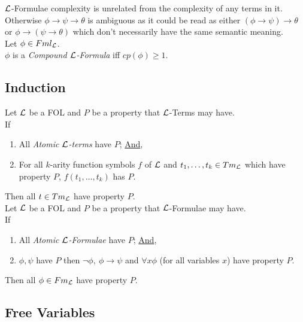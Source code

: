 \documentclass[11pt,a4paper]{article}
\begin{document}
$\mathcal{L}$-Formulae complexity is unrelated from the complexity of any terms in it.\\

Otherwise $\phi\to\psi\to\theta$ is ambiguous as it could be read as either $(\phi\to\psi)\to\theta$ or $\phi\to(\psi\to\theta)$ which don't necessarily have the same semantic meaning.\\

Let $\phi\in Fml_{\mathcal{L}}$.\\
$\phi$ is a \textit{Compound $\mathcal{L}$-Formula} iff $cp(\phi)\geq1$.\\

\subsection{Induction}

Let $\mathcal{L}$ be a FOL and $P$ be a property that $\mathcal{L}$-Terms may have.\\
If
\begin{enumerate}
	\item All \textit{Atomic $\mathcal{L}$-terms} have $P$; \underline{And},
	\item For all $k$-arity function symbols $f$ of $\mathcal{L}$ and $t_1,\dots,t_k\in Tm_{\mathcal{L}}$ which have property $P$, $f(t_1,\dots,t_k)$ has $P$. %
\end{enumerate}
Then all $t\in Tm_{\mathcal{L}}$ have property $P$.\\

Let $\mathcal{L}$ be a FOL and $P$ be a property that $\mathcal{L}$-Formulae may have.\\
If
\begin{enumerate}
	\item All \textit{Atomic $\mathcal{L}$-Formulae} have $P$; \underline{And},
	\item $\phi,\psi$ have $P$ then $\neg\phi,\ \phi\to\psi$ and $\forall x\phi$ (for all variables $x$) have property $P$.
\end{enumerate}
Then all $\phi\in Fm_{\mathcal{L}}$ have property $P$.

\subsection{Free Variables}
\end{document}

